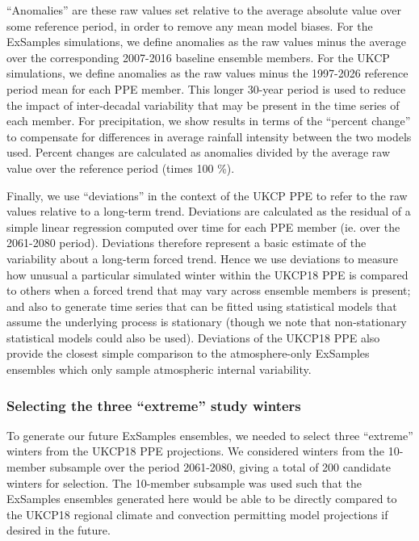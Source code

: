       ``Anomalies'' are these raw values set relative to the average absolute value over some reference period, in order to remove any mean model biases. For the ExSamples simulations, we define anomalies as the raw values minus the average over the corresponding 2007-2016 baseline ensemble members. For the UKCP simulations, we define anomalies as the raw values minus the 1997-2026 reference period mean for each PPE member. This longer 30-year period is used to reduce the impact of inter-decadal variability that may be present in the time series of each member. For precipitation, we show results in terms of the ``percent change'' to compensate for differences in average rainfall intensity between the two models used. Percent changes are calculated as anomalies divided by the average raw value over the reference period (times 100 \%).

      Finally, we use ``deviations'' in the context of the UKCP PPE to refer to the raw values relative to a long-term trend. Deviations are calculated as the residual of a simple linear regression computed over time for each PPE member (ie. over the 2061-2080 period). Deviations therefore represent a basic estimate of the variability about a long-term forced trend. Hence we use deviations to measure how unusual a particular simulated winter within the UKCP18 PPE is compared to others when a forced trend that may vary across ensemble members is present; and also to generate time series that can be fitted using statistical models that assume the underlying process is stationary (though we note that non-stationary statistical models could also be used). Deviations of the UKCP18 PPE also provide the closest simple comparison to the atmosphere-only ExSamples ensembles which only sample atmospheric internal variability.
  
    \subsubsection{Selecting the three ``extreme'' study winters}

      To generate our future ExSamples ensembles, we needed to select three ``extreme'' winters from the UKCP18 PPE projections. We considered winters from the 10-member subsample over the period 2061-2080, giving a total of 200 candidate winters for selection. The 10-member subsample was used such that the ExSamples ensembles generated here would be able to be directly compared to the UKCP18 regional climate and convection permitting model projections if desired in the future.

